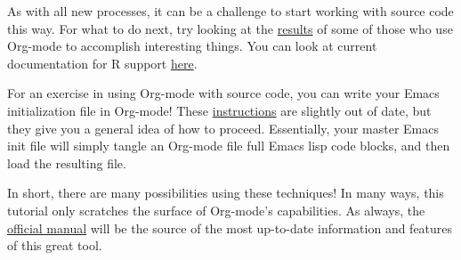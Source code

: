\documentclass[11pt]{article}
\begin{document}
As with all new processes, it can be a challenge to start working with source code this way.  For what to do next, try looking at the \href{http://orgmode.org/worg/org-contrib/babel/uses.php}{results} of some of those who use Org-mode to accomplish interesting things. You can look at current documentation for R support \href{http://orgmode.org/worg/org-contrib/babel/languages/ob-doc-R.html}{here}.

For an exercise in using Org-mode with source code, you can write your Emacs initialization file in Org-mode! These \href{http://orgmode.org/worg/org-contrib/babel/intro.php#sec-8_2_1}{instructions} are slightly out of date, but they give you a general idea of how to proceed. Essentially, your master Emacs init file will simply tangle an Org-mode file full Emacs lisp code blocks, and then load the resulting file.

In short, there are many possibilities using these techniques! In many ways, this tutorial only scratches the surface of Org-mode's capabilities. As always, the \href{http://orgmode.org/manual/index.html#Top}{official manual} will be the source of the most up-to-date information and features of this great tool.
\end{document}
